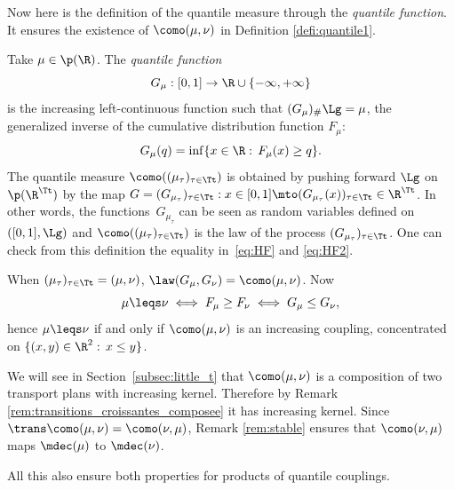 Now here is the definition of the quantile measure through the \emph{quantile function}. It ensures the existence of $\como(\mu,\nu)$ in Definition \ref{defi:quantile1}.

\begin{defi}\label{defi:quantile2} Take $\mu\in \p(\R)$. The \emph{quantile function}
\[
G_\mu:[0,1]\to \R\cup\{-\infty,+\infty\}
\]
is the increasing left-continuous function such that $(G_\mu)_\#\Lg=\mu$, \ie the generalized inverse of the cumulative distribution function $F_\mu$:
\[G_\mu(q)=\inf\{x\in\R:\,F_\mu (x)\geq q\}.\]
The quantile measure $\como((\mu_\tau)_{\tau\in\Tt})$ is obtained by pushing forward $\Lg$ on $\p(\R^{\Tt})$ by the map $G=(G_{\mu_\tau})_{\tau\in \Tt}:x\in [0,1]\mto (G_{\mu_{\tau}}(x))_{\tau\in\Tt}\in \R^{\Tt}$.
In other words, the functions~$G_{\mu_{\tau}}$ can be seen as random variables defined on $([0,1],\Lg)$ and $\como((\mu_\tau)_{\tau\in\Tt})$ is the law of the process $(G_{\mu_{\tau}})_{\tau\in\Tt}$. One can check from this definition the equality in~\eqref{eq:HF} and \eqref{eq:HF2}.
\end{defi}

\begin{rem}\label{rem:quantile_up}
When $(\mu_{\tau})_{\tau\in \Tt}=(\mu,\nu)$, $\law (G_\mu,G_\nu)=\como(\mu,\nu)$. Now
\[
\mu\leqs \nu\iff F_\mu\geq F_\nu \iff G_\mu\leq G_\nu,
\]
hence $\mu\leqs \nu$ if and only if $\como(\mu,\nu)$ is an increasing coupling, \ie concentrated on $\{(x,y)\in \R^2:\,x\leq y\}$.
\end{rem}

\begin{rem}\label{rem:quantile_transitions_croissantes}
We will see in Section~\ref{subsec:little_t} that $\como(\mu,\nu)$ is a composition of two transport plans with increasing kernel. Therefore by Remark \ref{rem:transitions_croissantes_composee} it has increasing kernel. Since $\trans \como(\mu,\nu)=\como(\nu,\mu)$, Remark \ref{rem:stable} ensures that $\como(\nu,\mu)$ maps $\mdec(\mu)$ to $\mdec(\nu)$.

All this also ensure both properties for products of quantile couplings.
\end{rem}

\label{subsec:rho}


